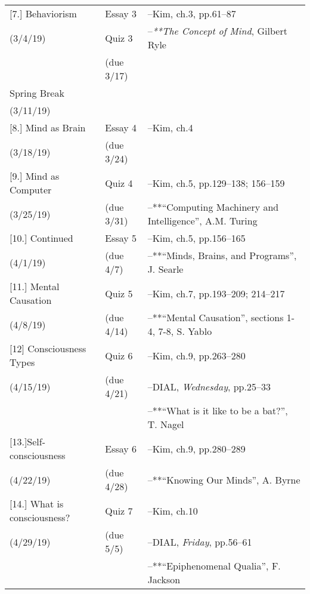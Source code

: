 \documentclass[article,oneside]{memoir}
\begin{document}
\begin{center}
\begin{longtable}{p{4.5cm}p{2cm}p{6cm}}
[7.] Behaviorism		    	& Essay 3	   		& --Kim, ch.3, pp.61--87 \\
(3/4/19)			        		& Quiz 3		&  --\emph{**The Concept of Mind}, Gilbert Ryle\\ 
		        		& (due 3/17)		& \\[1.8\baselineskip]



Spring Break 		    		& 		  		&  \\
(3/11/19)			        		&		    	  	&  \\ [1.8\baselineskip]

  
[8.] Mind as Brain 		   	& Essay 4	   		& --Kim, ch.4\\
(3/18/19)				         & (due 3/24)			 & \\  [1.8\baselineskip]	


[9.] Mind as Computer		& Quiz 4			& --Kim, ch.5, pp.129--138; 156--159\\
(3/25/19)		            		& (due 3/31)		& --**``Computing Machinery and Intelligence'', A.M. Turing  \\  [1.8\baselineskip]

[10.] Continued			    	& Essay 5			& --Kim, ch.5, pp.156--165 \\
(4/1/19)					& (due 4/7)		& --**``Minds, Brains, and Programs'', J.  Searle \\ [1.8\baselineskip]

[11.] Mental Causation 		& Quiz 5			& --Kim, ch.7, pp.193--209; 214--217 \\
(4/8/19)				      	& (due 4/14)	      	& --**``Mental Causation'', sections 1-4, 7-8, S. Yablo  \\  [1.8\baselineskip]
				
[12] Consciousness Types		 & Quiz 6			& --Kim, ch.9, pp.263--280 \\
(4/15/19)				      	& (due 4/21)		& --DIAL, \emph{Wednesday}, pp.25--33 \\
						& 				& --**``What is it like to be a bat?'', T. Nagel \\ [1.8\baselineskip]
 
[13.]Self-consciousness  	    	& Essay 6			& --Kim, ch.9, pp.280--289\\
(4/22/19)			      		& (due 4/28)		& --**``Knowing Our Minds'', A. Byrne  \\ [1.8\baselineskip]


[14.] What is consciousness? 	& Quiz 7			& --Kim, ch.10 \\ 
(4/29/19)				      	& (due 5/5)		& --DIAL, \emph{Friday}, pp.56--61 \\ 
					      	&			      	& --**``Epiphenomenal Qualia'', F. Jackson \\ [1.8\baselineskip]


\end{longtable}
\end{center}
\end{document}
